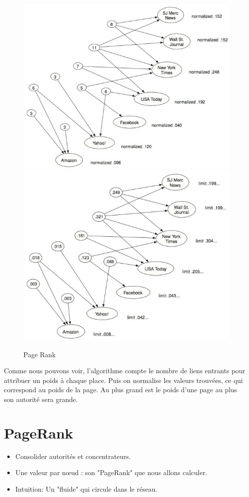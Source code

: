 \begin{figure}[!ht]
\centering

\includegraphics[width=0.8\linewidth]{images/ref/fig-14-4.jpeg}
\includegraphics[width=0.8\linewidth]{images/ref/fig-14-5.jpeg}
\caption{Page Rank}
\label{pageRankNews2}
\end{figure}



\newpage

	
Comme nous pouvons voir, l'algorithme compte le nombre de liens entrants pour attribuer un poids à chaque place. Puis on normalise les valeurs trouvées, ce qui correspond au poids de la page.
Au plus grand est le poids d'une page au plus son autorité sera grande.

\section{PageRank}
\begin{itemize}
	\item Consolider autorités et concentrateurs.
	\item Une valeur par nœud : son "PageRank" que nous allons calculer. 
	\item Intuition: Un "fluide" qui circule dans le réseau. 
\end{itemize}

